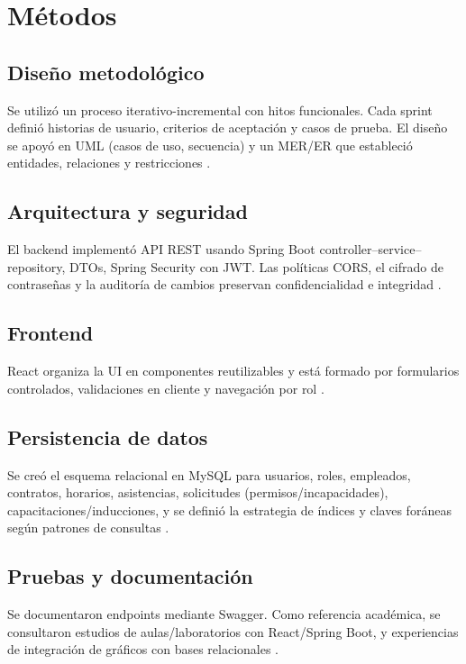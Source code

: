 \section{Métodos}

\subsection{Diseño metodológico}
Se utilizó un proceso iterativo-incremental con hitos funcionales. Cada sprint definió historias de usuario, criterios de aceptación y casos de prueba. El diseño se apoyó en UML (casos de uso, secuencia) y un MER/ER que estableció entidades, relaciones y restricciones \cite{analisis_google_charts}.

\subsection{Arquitectura y seguridad}
El backend implementó API REST usando Spring Boot controller–service–repository, DTOs, Spring Security con JWT. Las políticas CORS, el cifrado de contraseñas y la auditoría de cambios preservan confidencialidad e integridad \cite{estudio_aplicaciones_java}.

\subsection{Frontend}
React organiza la UI en componentes reutilizables y está formado por formularios controlados, validaciones en cliente y navegación por rol \cite{analisis_frameworks_frontend}\cite{optimizacion_bootstrap}.

\subsection{Persistencia de datos}
Se creó el esquema relacional en MySQL para usuarios, roles, empleados, contratos, horarios, asistencias, solicitudes (permisos/incapacidades), capacitaciones/inducciones, y se definió la estrategia de índices y claves foráneas según patrones de consultas \cite{analisis_google_charts}.

\subsection{Pruebas y documentación}
Se documentaron endpoints mediante Swagger. Como referencia académica, se consultaron estudios de aulas/laboratorios con React/Spring Boot, y experiencias de integración de gráficos con bases relacionales \cite{laboratorio_estadistica_react}\cite{analisis_google_charts}.